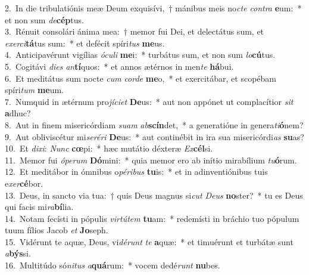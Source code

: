 {2.~}In die tribulatiónis meæ Deum exquisívi,~† mánibus meis no\textit{cte} \textit{con}\textit{tra} \textbf{e}um:~* et non sum \textit{de}\textbf{cép}tus.\\
{3.~}Rénuit consolári ánima mea:~† memor fui Dei, et delectátus sum, et \textit{e}\textit{xer}\textit{ci}\textbf{tá}tus sum:~* et defécit spíri\textit{tus} \textbf{me}us.\\
{4.~}Anticipavérunt vigílias \textit{ó}\textit{cu}\textit{li} \textbf{me}i:~* turbátus sum, et non sum \textit{lo}\textbf{cú}tus.\\
{5.~}Cogitávi \textit{di}\textit{es} \textit{an}\textbf{tí}quos:~* et annos ætérnos in men\textit{te} \textbf{há}bui.\\
{6.~}Et meditátus sum nocte \textit{cum} \textit{cor}\textit{de} \textbf{me}o,~* et exercitábar, et scopébam spíri\textit{tum} \textbf{me}um.\\
{7.~}Numquid in ætérnum pro\textit{jí}\textit{ci}\textit{et} \textbf{De}us:~* aut non appónet ut complacítior \textit{sit} \textbf{a}dhuc?\\
{8.~}Aut in finem misericórdiam \textit{su}\textit{am} \textit{ab}\textbf{scín}det,~* a generatióne in genera\textit{ti}\textbf{ó}nem?\\
{9.~}Aut obliviscétur mi\textit{se}\textit{ré}\textit{ri} \textbf{De}us:~* aut continébit in ira sua misericórdi\textit{as} \textbf{su}as?\\
{10.~}Et \textit{di}\textit{xi}: \textit{Nunc} \textbf{cœ}pi:~* hæc mutátio déxteræ \textit{Ex}\textbf{cél}si.\\
{11.~}Memor fui \textit{ó}\textit{pe}\textit{rum} \textbf{Dó}mini:~* quia memor ero ab inítio mirabílium \textit{tu}\textbf{ó}rum.\\
{12.~}Et meditábor in ómnibus o\textit{pé}\textit{ri}\textit{bus} \textbf{tu}is:~* et in adinventiónibus tuis e\textit{xer}\textbf{cé}bor.\\
{13.~}Deus, in sancto via tua:~† quis Deus magnus si\textit{cut} \textit{De}\textit{us} \textbf{no}ster?~* tu es Deus qui facis mi\textit{ra}\textbf{bí}lia.\\
{14.~}Notam fecísti in pópulis \textit{vir}\textit{tú}\textit{tem} \textbf{tu}am:~* redemísti in bráchio tuo pópulum tuum fílios Jacob \textit{et} \textbf{Jo}seph.\\
{15.~}Vidérunt te aquæ, Deus, vi\textit{dé}\textit{runt} \textit{te} \textbf{a}quæ:~* et timuérunt et turbátæ sunt \textit{a}\textbf{býs}si.\\
{16.~}Multitúdo só\textit{ni}\textit{tus} \textit{a}\textbf{quá}rum:~* vocem dedé\textit{runt} \textbf{nu}bes.\\
